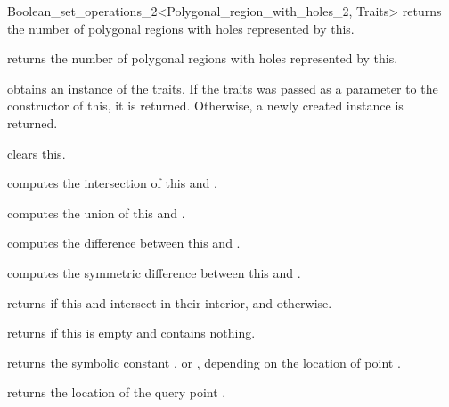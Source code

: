 \begin{ccRefClass}{Boolean_set_operations_2<Polygonal_region_with_holes_2, Traits>}
  {returns the number of polygonal regions with holes represented by
  this.}

  {returns the number of polygonal regions with holes represented by
  this.}

  {obtains an instance of the traits. If the traits was passed as a
  parameter to the constructor of this, it is returned. Otherwise, a
  newly created instance is returned.}

\ccModifiers
  {clears this.}

  {computes the intersection of this and .}

  {computes the union of this and .}

  {computes the difference between this and .}

  {computes the symmetric difference between this and .}
  
\ccPredicates
  {returns  if this and  intersect in their
  interior, and  otherwise.}

  {returns  if this is empty and contains nothing.}

  {returns the symbolic constant ,
   or , depending on the
  location of point .}

  {returns the location of the query point .}

\ccSeeAlso
  \\

\end{ccRefClass}

\ccRefPageEnd
